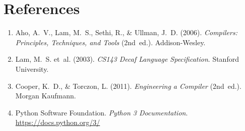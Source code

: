 \documentclass[12pt,a4paper]{article}
\begin{document}
\section{References}

\begin{enumerate}
  \item Aho, A.~V., Lam, M.~S., Sethi, R., \& Ullman, J.~D. (2006).
        \textit{Compilers: Principles, Techniques, and Tools} (2nd~ed.).
        Addison-Wesley.
  \item Lam, M.~S. et~al. (2003). \textit{CS143 Decaf Language Specification}.
        Stanford University.
  \item Cooper, K.~D., \& Torczon, L. (2011).
        \textit{Engineering a Compiler} (2nd~ed.). Morgan Kaufmann.
  \item Python Software Foundation. \textit{Python 3 Documentation}.
        \url{https://docs.python.org/3/}
\end{enumerate}
\end{document}
